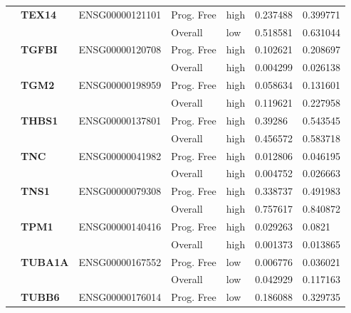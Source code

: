 \begin{spacing}{1}
{\begin{longtable}{|>{\bfseries}p{2cm}|>{\bfseries}p{1.9cm}|p{2.8cm}|p{2cm}|p{2cm}|p{1.5cm}|p{1.5cm}|}
             & TEX14    & ENSG00000121101 & Prog. Free & high & 0.237488 & 0.399771 \\
            \hhline{~~~----}
             &          &                 & Overall    & low  & 0.518581 & 0.631044 \\
            \hhline{~======}
             & TGFBI    & ENSG00000120708 & Prog. Free & high & 0.102621 & 0.208697 \\
            \hhline{~~~----}
             &          &                 & Overall    & high & 0.004299 & 0.026138 \\
            \hhline{~======}
             & TGM2     & ENSG00000198959 & Prog. Free & high & 0.058634 & 0.131601 \\
            \hhline{~~~----}
             &          &                 & Overall    & high & 0.119621 & 0.227958 \\
            \hhline{~======}
             & THBS1    & ENSG00000137801 & Prog. Free & high & 0.39286  & 0.543545 \\
            \hhline{~~~----}
             &          &                 & Overall    & high & 0.456572 & 0.583718 \\
            \hhline{~======}
             & TNC      & ENSG00000041982 & Prog. Free & high & 0.012806 & 0.046195 \\
            \hhline{~~~----}
             &          &                 & Overall    & high & 0.004752 & 0.026663 \\
            \hhline{~======}
             & TNS1     & ENSG00000079308 & Prog. Free & high & 0.338737 & 0.491983 \\
            \hhline{~~~----}
             &          &                 & Overall    & high & 0.757617 & 0.840872 \\
            \hhline{~======}
             & TPM1     & ENSG00000140416 & Prog. Free & high & 0.029263 & 0.0821   \\
            \hhline{~~~----}
             &          &                 & Overall    & high & 0.001373 & 0.013865 \\
            \hhline{~======}
             & TUBA1A   & ENSG00000167552 & Prog. Free & low  & 0.006776 & 0.036021 \\
            \hhline{~~~----}
             &          &                 & Overall    & low  & 0.042929 & 0.117163 \\
            \hhline{~======}
             & TUBB6    & ENSG00000176014 & Prog. Free & low  & 0.186088 & 0.329735 \\

\end{longtable}}
\end{spacing}
